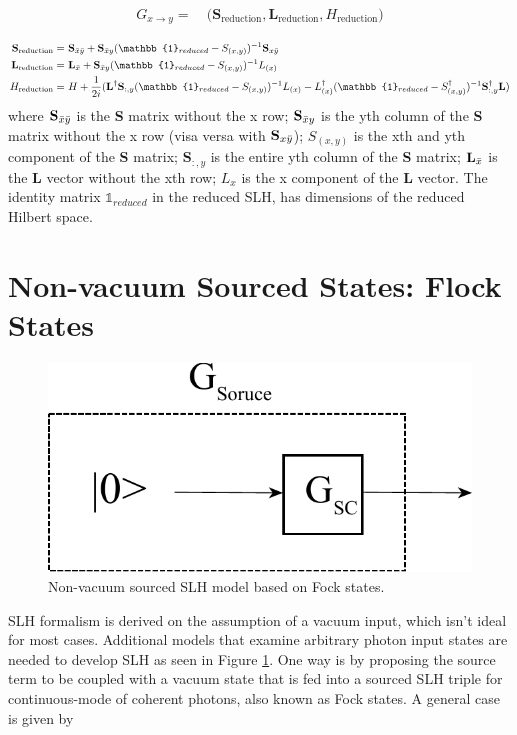 \documentclass[a4paper]{article}
\begin{document}
\begin{align*}
    G_{x \rightarrow y} = & \ \Bigg( \textbf{S}_{\text{reduction}}, \textbf{L}_{\text{reduction}}, H_{\text{reduction}} \Bigg) \\
\end{align*}
\begin{align}
\textbf{S}_{\text{reduction}} = & \ \textbf{S}_{\Bar{x}\Bar{y}} + \textbf{S}_{\Bar{x}y}(\mathbb{1}_{reduced}-S_{(x,y)})^{-1}\textbf{S}_{x\Bar{y}} \\
\textbf{L}_{\text{reduction}} = & \ \textbf{L}_{\Bar{x}}+\textbf{S}_{\Bar{x}y}(\mathbb{1}_{reduced}-S_{(x,y)})^{-1}L_{(x)} \\
H_{\text{reduction}} = & \ H + \frac{1}{2i}(\textbf{L}^\dagger \textbf{S}_{:,y}(\mathbb{1}_{reduced}-S_{(x,y)})^{-1}L_{(x)} - L_{(x)}^\dagger (\mathbb{1}_{reduced}-S^\dagger_{(x,y)})^{-1}\textbf{S}^\dagger_{:,y}\textbf{L}) 
    \label{eq:feedback}
\end{align}
where $\textbf{S}_{\Bar{x}\Bar{y}} $ is the \textbf{S} matrix without the x row; $\textbf{S}_{\Bar{x}y}$ is the yth column of the \textbf{S} matrix without the x row (visa versa with $\textbf{S}_{x\Bar{y}}$); $S_{(x,y)}$ is the xth and yth component of the \textbf{S} matrix; $\textbf{S}_{:,y}$ is the entire yth column of the \textbf{S} matrix; $\textbf{L}_{\Bar{x}}$ is the \textbf{L} vector without the xth row; $L_x$ is the x component of the \textbf{L} vector. The identity matrix $\mathbb{1}_{reduced}$ in the reduced SLH, has dimensions of the reduced Hilbert space.

\section{ Non-vacuum Sourced States: Flock States}

\begin{figure}[H]
\centering
\includegraphics[width = 7.5 cm]{Soruce_term.pdf}
\caption{Non-vacuum sourced SLH model based on Fock states.
}
\label{fig:soruced_term}
\end{figure}  
SLH formalism is derived on the assumption of a vacuum input, which isn't ideal for most cases. Additional models that examine arbitrary photon input states are needed to develop SLH as seen in Figure \ref{fig:soruced_term}. One way is by proposing the source term to be coupled with a vacuum state that is fed into a sourced SLH triple for continuous-mode of coherent photons, also known as Fock states. A general case is given by  
\end{document}
